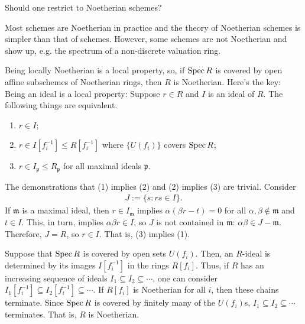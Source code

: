 \documentclass [11 pt, oneside] {article}
\begin{document}
\begin{problem}
	Should one restrict to Noetherian schemes?
\end{problem}

Most schemes are Noetherian in practice and the theory of Noetherian schemes is simpler than that of schemes. However, some schemes are not Noetherian and show up, e.g. the spectrum of a non-discrete valuation ring.

\begin{remark}
	Being locally Noetherian is a local property, so, if $\operatorname{Spec} R$ is covered by open affine subschemes of Noetherian rings, then $R$ is Noetherian. Here's the key: Being an ideal is a local property: Suppose $r\in R$ and $I$ is an ideal of $R$. The following things are equivalent.
	\begin{enumerate}
		\item $r\in I$;
		\item $r\in I[f_i^{-1}]\le R[f_i^{-1}]$ where $\{U({f_i})\}$ covers $\operatorname{Spec} R$;
		\item $r\in I_{\mathfrak{p}}\le R_{\mathfrak{p}}$ for all maximal ideals $\mathfrak{p}$.
	\end{enumerate}
	The demonstrations that (1) implies (2) and (2) implies (3) are trivial. Consider
	\begin{align*}
		J := \{ s : rs \in I\}.
	\end{align*}
	If $\mathfrak{m}$ is a maximal ideal, then $r\in I_{\mathfrak{m}}$ implies $\alpha(\beta r - t) =0$ for all $\alpha,\beta\notin \mathfrak{m}$ and $t\in I$. This, in turn, implies $\alpha\beta r\in I$, so $J$ is not contained in $\mathfrak{m}$: $\alpha\beta\in J-\mathfrak{m}$. Therefore, $J=R$, so $r\in I$. That is, (3) implies (1).

Suppose that $\operatorname{Spec} R$ is covered by open sets $U({f_i})$. Then, an $R$-ideal is determined by its images $I[f_i^{-1}]$ in the rings $R[f_i]$. Thus, if $R$ has an increasing sequence of ideals $I_1\subseteq I_2\subseteq \cdots$, one can consider $I_1[f_i^{-1}]\subseteq I_2[f_i^{-1}]\subseteq\cdots$. If $R[f_i]$ is Noetherian for all $i$, then these chains terminate. Since $\operatorname{Spec} R$ is covered by finitely many of the $U({f_i})$s, $I_1\subseteq I_2\subseteq \cdots$ terminates. That is, $R$ is Noetherian.  
\end{remark}
\end{document}
